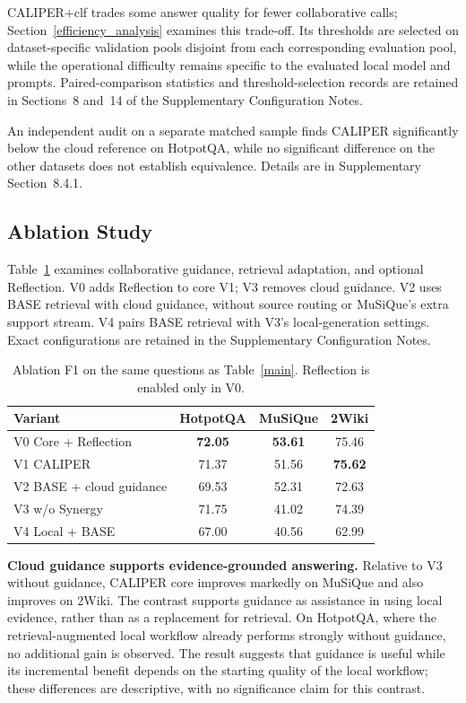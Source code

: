 \documentclass[a4paper,fleqn]{cas-dc}
\begin{document}
CALIPER+clf trades some answer quality for fewer collaborative calls; Section~\ref{efficiency_analysis} examines this trade-off. Its thresholds are selected on dataset-specific validation pools disjoint from each corresponding evaluation pool, while the operational difficulty remains specific to the evaluated local model and prompts. Paired-comparison statistics and threshold-selection records are retained in Sections~8 and~14 of the Supplementary Configuration Notes.

An independent audit on a separate matched sample finds CALIPER significantly below the cloud reference on HotpotQA, while no significant difference on the other datasets does not establish equivalence. Details are in Supplementary Section~8.4.1.

\subsection{Ablation Study}
Table~\ref{ablation} examines collaborative guidance, retrieval adaptation, and optional Reflection. V0 adds Reflection to core V1; V3 removes cloud guidance. V2 uses BASE retrieval with cloud guidance, without source routing or MuSiQue's extra support stream. V4 pairs BASE retrieval with V3's local-generation settings. Exact configurations are retained in the Supplementary Configuration Notes.
\begin{table}[pos=!htb]
\caption{Ablation F1 on the same questions as Table~\ref{main}. Reflection is enabled only in V0.}
\label{ablation}
\centering
\fontsize{8}{10}\selectfont
\setlength{\tabcolsep}{3pt}
\begin{tabular}{lccc}
\toprule
\textbf{Variant} & \textbf{HotpotQA} & \textbf{MuSiQue} & \textbf{2Wiki} \\
\midrule
V0 Core + Reflection & \textbf{72.05} & \textbf{53.61} & 75.46 \\
V1 CALIPER & 71.37 & 51.56 & \textbf{75.62} \\
V2 BASE + cloud guidance & 69.53 & 52.31 & 72.63 \\
V3 w/o Synergy & 71.75 & 41.02 & 74.39 \\
V4 Local + BASE & 67.00 & 40.56 & 62.99 \\
\bottomrule
\end{tabular}
\end{table}

\textbf{Cloud guidance supports evidence-grounded answering.} Relative to V3 without guidance, CALIPER core improves markedly on MuSiQue and also improves on 2Wiki. The contrast supports guidance as assistance in using local evidence, rather than as a replacement for retrieval. On HotpotQA, where the retrieval-augmented local workflow already performs strongly without guidance, no additional gain is observed. The result suggests that guidance is useful while its incremental benefit depends on the starting quality of the local workflow; these differences are descriptive, with no significance claim for this contrast.
\end{document}
